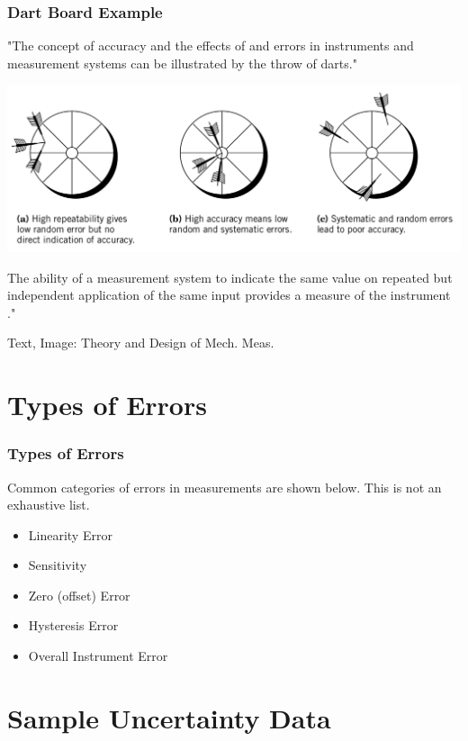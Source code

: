 \documentclass[fleqn]{beamer} %
\newcommand{\sectiontitleII}{Dart Board Example}
\newcommand{\sectiontitleIII}{Types of Errors}
\newcommand{\sectiontitleIV}{Sample Uncertainty Data}
\begin{document}
\begin{frame}[label=sectionIII]
\frametitle{\sectiontitleII}

"The concept of accuracy and the effects of \hspcu and \hspcu errors in instruments
and measurement systems can be illustrated by the throw of darts."

\includegraphics[scale=.20]{dart_throw.png}

The ability of a measurement system to indicate the same value on repeated but independent
application of the same input provides a measure of the instrument \hspcu."

{\tiny Text, Image: Theory and Design of Mech. Meas.}
\end{frame}


\section{\sectiontitleIII}

\begin{frame}[label=sectionIII]
\frametitle{\sectiontitleIII}

Common categories of errors in measurements are shown below. This is not an exhaustive list.  

\begin{itemize}
	
	\item Linearity Error \vspc
	\item Sensitivity \vspc
	\item Zero (offset) Error \vspc
	\item Hysteresis Error \vspc
	\item Overall Instrument Error \vspc
\end{itemize}


\end{frame}

\section{\sectiontitleIV}
\end{document}
